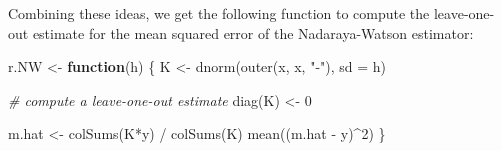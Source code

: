 \documentclass[
  a4paper,
]{article}
\newenvironment{Shaded}{\begin{snugshade}}{\end{snugshade}}
\newcommand{\AttributeTok}[1]{\textcolor[rgb]{0.77,0.63,0.00}{#1}}
\newcommand{\CommentTok}[1]{\textcolor[rgb]{0.56,0.35,0.01}{\textit{#1}}}
\newcommand{\ControlFlowTok}[1]{\textcolor[rgb]{0.13,0.29,0.53}{\textbf{#1}}}
\newcommand{\DecValTok}[1]{\textcolor[rgb]{0.00,0.00,0.81}{#1}}
\newcommand{\FunctionTok}[1]{\textcolor[rgb]{0.00,0.00,0.00}{#1}}
\newcommand{\NormalTok}[1]{#1}
\newcommand{\OtherTok}[1]{\textcolor[rgb]{0.56,0.35,0.01}{#1}}
\newcommand{\SpecialCharTok}[1]{\textcolor[rgb]{0.00,0.00,0.00}{#1}}
\newcommand{\StringTok}[1]{\textcolor[rgb]{0.31,0.60,0.02}{#1}}
\theoremstyle{definition}
\theoremstyle{definition}
\theoremstyle{definition}
\theoremstyle{definition}
\theoremstyle{remark}
\begin{document}
Combining these ideas, we get the following function
to compute the leave-one-out estimate for the mean squared error of
the Nadaraya-Watson estimator:

\begin{Shaded}
\begin{Highlighting}[]
\NormalTok{r.NW }\OtherTok{\textless{}{-}} \ControlFlowTok{function}\NormalTok{(h) \{}
\NormalTok{    K }\OtherTok{\textless{}{-}} \FunctionTok{dnorm}\NormalTok{(}\FunctionTok{outer}\NormalTok{(x, x, }\StringTok{"{-}"}\NormalTok{), }\AttributeTok{sd =}\NormalTok{ h)}

    \CommentTok{\# compute a leave{-}one{-}out estimate}
    \FunctionTok{diag}\NormalTok{(K) }\OtherTok{\textless{}{-}} \DecValTok{0}

\NormalTok{    m.hat }\OtherTok{\textless{}{-}} \FunctionTok{colSums}\NormalTok{(K}\SpecialCharTok{*}\NormalTok{y) }\SpecialCharTok{/} \FunctionTok{colSums}\NormalTok{(K)}
    \FunctionTok{mean}\NormalTok{((m.hat }\SpecialCharTok{{-}}\NormalTok{ y)}\SpecialCharTok{\^{}}\DecValTok{2}\NormalTok{)}
\NormalTok{\}}
\end{Highlighting}
\end{Shaded}
\end{document}
